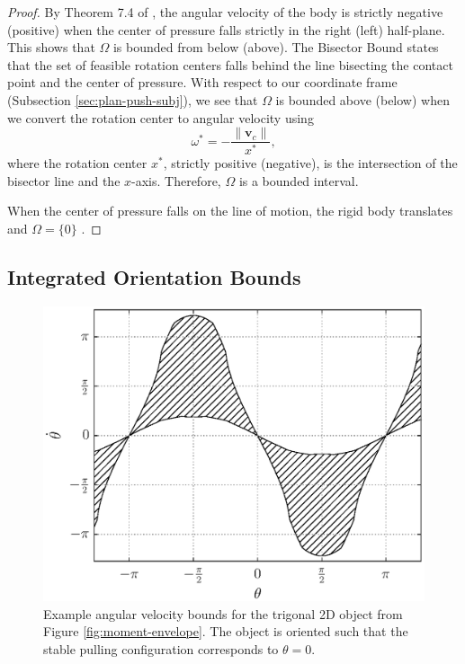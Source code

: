 \documentclass[conference]{IEEEtran}
\begin{document}
\begin{proof}
  By Theorem 7.4 of \cite{Mason}, the angular velocity of the body is
  strictly negative (positive) when the center of pressure falls
  strictly in the right (left) half-plane. This shows that $\Omega$ is
  bounded from below (above). The Bisector Bound \cite{Mason} states
  that the set of feasible rotation centers falls behind the line
  bisecting the contact point and the center of pressure. With respect
  to our coordinate frame (Subsection \ref{sec:plan-push-subj}), we
  see that $\Omega$ is bounded above (below) when we convert the
  rotation center to angular velocity using
  \begin{equation}
    \omega^* = -\frac{\lVert\mathbf{v}_c\rVert}{x^*}, \label{eq:rot-to-ang}
  \end{equation}
  where the rotation center $x^*$, strictly positive (negative), is
  the intersection of the bisector line and the $x$-axis. Therefore,
  $\Omega$ is a bounded interval.

  When the center of pressure falls on the line of motion, the rigid
  body translates and $\Omega = \{0\}$ \cite{Mason}.
\end{proof}

\subsection{Integrated Orientation Bounds}\label{sec:orientation-bounds}

\begin{figure}[t]
  \centering
    \includegraphics[width=1\linewidth]{fig/omega_bounds}
    \caption{Example angular velocity bounds for the trigonal 2D
      object from Figure \ref{fig:moment-envelope}. The object is
      oriented such that the stable pulling configuration corresponds
      to $\theta=0$.}
  \label{fig:omega-bounds}
\end{figure}
\end{document}
